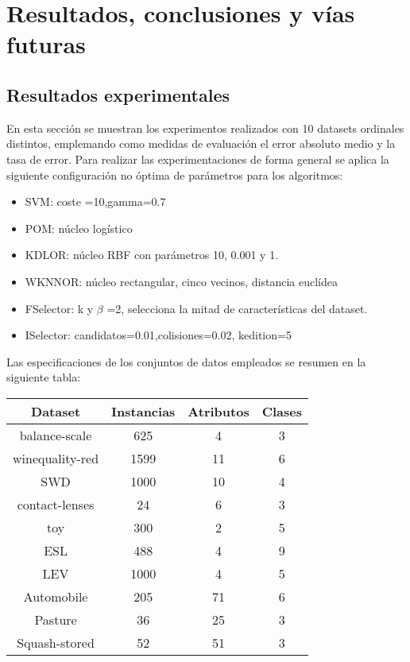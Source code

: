 \chapter{Resultados, conclusiones y vías futuras}
\label{conclusion}
\section{Resultados experimentales}
En esta sección se muestran los experimentos realizados con 10 datasets ordinales distintos, emplemando como medidas de evaluación el error absoluto medio y la tasa de error. Para realizar las experimentaciones de forma general se aplica la siguiente configuración no óptima de parámetros para los algoritmos:
\begin{itemize}
	\item SVM: coste =10,gamma=0.7
	\item POM: núcleo logístico
	\item KDLOR: núcleo RBF con parámetros 10, 0.001 y 1.
	\item WKNNOR: núcleo rectangular, cinco vecinos, distancia euclídea
	\item FSelector: k y $\beta$ =2, selecciona la mitad de características del dataset.
	\item ISelector: candidatos=0.01,colisiones=0.02, kedition=5
\end{itemize} 

Las especificaciones de los conjuntos de datos empleados se resumen en la siguiente tabla:

\begin{center}
	\begin{tabular}{ c c c c }
		 Dataset & Instancias & Atributos & Clases \\
		\hline	
		balance-scale &	625 & 4 & 3 \\
		winequality-red & 1599 & 11 & 6 \\
		SWD & 1000 & 10 & 4 \\
		contact-lenses & 24 & 6 & 3 \\
		toy & 300 & 2 & 5 \\
		ESL & 488 & 4 & 9 \\
		LEV & 1000 & 4 & 5 \\
		Automobile & 205 & 71 & 6\\
		Pasture & 36 & 25 & 3\\
		Squash-stored & 52 & 51 & 3 \\
		\hline  
	\end{tabular}
\end{center}

